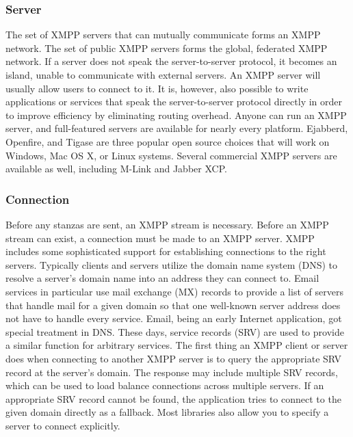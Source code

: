     \subsubsection{Server}
	The set of XMPP servers that can mutually communicate forms an XMPP network. The set of public XMPP servers forms the global, federated XMPP network. If a server does not speak the server-to-server protocol, it becomes an island, unable to communicate with external servers. An XMPP server will usually allow users to connect to it. It is, however, also possible to write applications or services that speak the server-to-server protocol directly in order to improve efficiency by eliminating routing overhead. Anyone can run an XMPP server, and full-featured servers are available for nearly every platform. Ejabberd, Openfire, and Tigase are three popular open source choices that will work on Windows, Mac OS X, or Linux systems. Several commercial XMPP servers are available as well, including M-Link and Jabber XCP.
	
	\subsubsection{Connection}
	Before any stanzas are sent, an XMPP stream is necessary. Before an XMPP stream can exist, a connection must be made to an XMPP server. XMPP includes some sophisticated support for establishing connections to the right servers. Typically clients and servers utilize the domain name system (DNS) to resolve a server’s domain name into an address they can connect to. Email services in particular use mail exchange (MX) records to provide a list of servers that handle mail for a given domain so that one well-known server address does not have to handle every service. Email, being an early Internet application, got special treatment in DNS. These days, service records (SRV) are used to provide a similar function for arbitrary services. The first thing an XMPP client or server does when connecting to another XMPP server is to query the appropriate SRV record at the server’s domain. The response may include multiple SRV records, which can be used to load balance connections across multiple servers. If an appropriate SRV record cannot be found, the application tries to connect to the given domain directly as a fallback. Most libraries also allow you to specify a server to connect explicitly.

